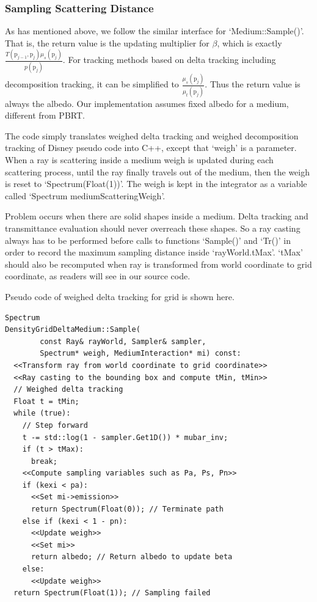 \documentclass[acmtog]{acmart}
\def\p{\mathrm{p}}
\begin{document}
\subsubsection{Sampling Scattering Distance}
    As has mentioned above, we follow the similar interface for `Medium::Sample()'.
    That is, the return value is the updating multiplier for $\beta$, which is exactly $\frac{T(\p_{j-1},\p_j)\mu_s(\p_j)}{p({\p_j})}$.
    For tracking methods based on delta tracking including decomposition tracking, it can be simplified to $\frac{\mu_s(\p_j)}{\mu_t(\p_j)}$.
    Thus the return value is always the albedo.
    Our implementation assumes fixed albedo for a medium, different from PBRT.\par
        The code simply translates weighed delta tracking and weighed decomposition tracking of Disney pseudo code into C++, 
    except that `weigh' is a parameter.
    When a ray is scattering inside a medium weigh is updated during each scattering process, 
    until the ray finally travels out of the medium, then the weigh is reset to `Spectrum(Float(1))'.
    The weigh is kept in the integrator as a variable called `Spectrum mediumScatteringWeigh'.\par
        Problem occurs when there are solid shapes inside a medium.
    Delta tracking and transmittance evaluation should never overreach these shapes.
    So a ray casting always has to be performed before calls to functions `Sample()' and `Tr()' in order to record the maximum sampling distance inside `rayWorld.tMax'.
    `tMax' should also be recomputed when ray is transformed from world coordinate to grid coordinate, as readers will see in our source code.\par
        Pseudo code of weighed delta tracking for grid is shown here.
\lstset{basicstyle=\tiny\ttfamily}
\begin{lstlisting}
Spectrum
DensityGridDeltaMedium::Sample(
        const Ray& rayWorld, Sampler& sampler, 
        Spectrum* weigh, MediumInteraction* mi) const:
  <<Transform ray from world coordinate to grid coordinate>>
  <<Ray casting to the bounding box and compute tMin, tMin>>
  // Weighed delta tracking
  Float t = tMin;
  while (true):
    // Step forward
    t -= std::log(1 - sampler.Get1D()) * mubar_inv;
    if (t > tMax):
      break;
    <<Compute sampling variables such as Pa, Ps, Pn>>
    if (kexi < pa):
      <<Set mi->emission>>
      return Spectrum(Float(0)); // Terminate path
    else if (kexi < 1 - pn):
      <<Update weigh>>
      <<Set mi>>
      return albedo; // Return albedo to update beta
    else:
      <<Update weigh>>
  return Spectrum(Float(1)); // Sampling failed
\end{lstlisting}
\end{document}
